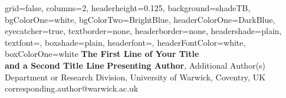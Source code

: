 \documentclass[latin,a0paper,portrait]{xebaposter}
\begin{document}
\begin{poster}{
    grid=false, %
    columns=2, %
    headerheight=0.125\textheight, %
    background=shadeTB,
    bgColorOne=white, %
    bgColorTwo=BrightBlue, %
    headerColorOne=DarkBlue,
    eyecatcher=true, %
    textborder=none,
    headerborder=none,
    headershade=plain,
    textfont=\color{WarwickGrey},
    boxshade=plain,
    headerfont=\Large\sffamily,
    headerFontColor=white,
    boxColorOne=white
}
{
}
{
    \color{WarwickGrey}\sffamily\bfseries
	The First Line of Your Title\vspace{6pt}\\
	and a Second Title Line\vspace{10pt}
}
{
    \color{WarwickGrey}
	\textbf{Presenting Author}, Additional Author(s)\\
	\vspace{-2pt}
	{\smaller[2] Department or Research Division, University of Warwick, Coventry, UK}\\
	\vspace{2pt}
	{\smaller[2] corresponding.author@warwick.ac.uk}
}
{
\hbox{\phantom{\rule{0.3\textwidth}{0.1\textheight}}}

}


\end{poster}
\end{document}
